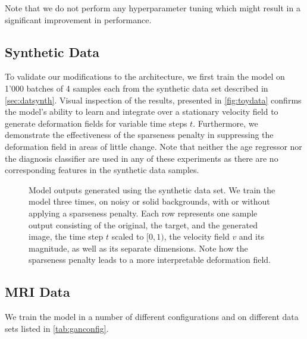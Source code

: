 Note that we do not perform any hyperparameter tuning which might result in a significant improvement in performance.

\subsection{Synthetic Data}
To validate our modifications to the architecture, we first train the model on 1'000 batches of 4 samples each from the synthetic data set described in \autoref{sec:datsynth}. Visual inspection of the results, presented in \autoref{fig:toydata} confirms the model's ability to learn and integrate over a stationary velocity field to generate deformation fields for variable time steps $t$. Furthermore, we demonstrate the effectiveness of the sparseness penalty in suppressing the deformation field in areas of little change. Note that neither the age regressor nor the diagnosis classifier are used in any of these experiments as there are no corresponding features in the synthetic data samples.

\begin{figure}
	\centering
	
	\vspace*{-15pt}
	\caption{Model outputs generated using the synthetic data set. We train the model three times, on noisy or solid backgrounds, with or without applying a sparseness penalty. Each row represents one sample output consisting of the original, the target, and the generated image, the time step $t$ scaled to $[0, 1)$, the velocity field $v$ and its magnitude, as well as its separate dimensions. Note how the sparseness penalty leads to a more interpretable deformation field.}
	\label{fig:toydata}
\end{figure}

\subsection{MRI Data} %

We train the model in a number of different configurations and on different data sets listed in \autoref{tab:ganconfig}.

